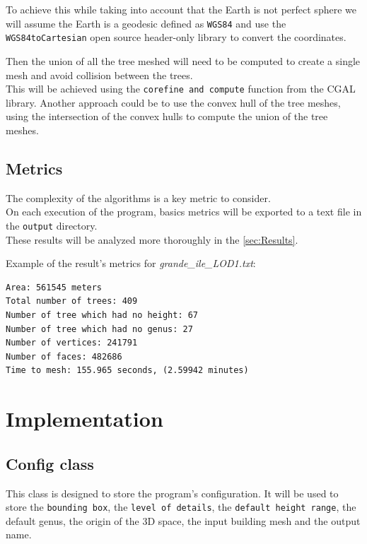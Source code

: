 \documentclass[12pt]{article}
\begin{document}
To achieve this while taking into account that the Earth is not perfect sphere
we will assume the Earth is a geodesic defined as \texttt{WGS84}\cite{wgs84} and use 
the \texttt{WGS84toCartesian}\cite{wgs84_to_cartesian} open source header-only
library to convert the coordinates.

Then the union of all the tree meshed will need to be computed to create a single mesh
and avoid collision between the trees. \\
This will be achieved using the \texttt{corefine and compute}\cite{corefine-compute}
function from the CGAL library.
Another approach could be to use the convex hull of the tree meshes, using the
intersection of the convex hulls to compute the union of the tree meshes.

\subsection{Metrics}
The complexity of the algorithms is a key metric to consider. \\
On each execution of the program, basics metrics will be exported to a text file in
the \texttt{output} directory. \\
These results will be analyzed more thoroughly in the \autoref{sec:Results}.

Example of the result's metrics for \textit{grande\_ile\_LOD1.txt}:

\begin{lstlisting}
Area: 561545 meters
Total number of trees: 409
Number of tree which had no height: 67
Number of tree which had no genus: 27
Number of vertices: 241791
Number of faces: 482686
Time to mesh: 155.965 seconds, (2.59942 minutes)
\end{lstlisting}

\newpage

\section{Implementation}

\subsection{Config class}

This class is designed to store the program's configuration. It will be used to
store the \texttt{bounding box}, the \texttt{level of details}, the
\texttt{default height range}, the default
genus, the origin of the 3D space, the input building mesh and the output name.
\end{document}
